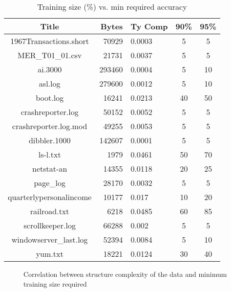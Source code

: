 \begin{table}
\begin{center}
\begin{tabular}{|c|r|l|c|c|} \hline
Title 			& Bytes 	& Ty Comp	& 90\% 		& 95\% \\ \hline \hline
1967Transactions.short	& 70929		& 0.0003	& 5		& 5 			\\ \hline
MER\_T01\_01.csv        & 21731 	& 0.0037	& 5		& 5\\ \hline
ai.3000                 & 293460 	& 0.0004	& 5		& 10\\ \hline
asl.log                 & 279600	& 0.0012	& 5		& 10\\ \hline
boot.log                & 16241		& 0.0213	& 40		& 50\\ \hline
crashreporter.log       & 50152 	& 0.0052	& 5		& 5\\ \hline
crashreporter.log.mod   & 49255		& 0.0053	& 5		& 5\\ \hline
dibbler.1000            & 142607 	& 0.0001	& 5		& 5\\ \hline
ls-l.txt                & 1979		& 0.0461	& 50		& 70\\ \hline
netstat-an              & 14355		& 0.0118	& 20		& 25\\ \hline
page\_log               & 28170		& 0.0032	& 5		& 5\\ \hline
quarterlypersonalincome & 10177		& 0.017		& 10		& 20\\ \hline
railroad.txt            & 6218		& 0.0485	& 60		& 85\\ \hline
scrollkeeper.log        & 66288		& 0.002		& 5		& 5\\ \hline
windowserver\_last.log  & 52394		& 0.0084	& 5		& 10\\ \hline
yum.txt                 & 18221		& 0.0124	& 30		& 40\\ \hline
\end{tabular}
\caption{Training size (\%) vs. min required accuracy}
\end{center}
\end{table}

\begin{figure}
\begin{center}
\caption{Correlation between structure complexity of 
the data and minimum training size required}
\end{center}
\end{figure}
